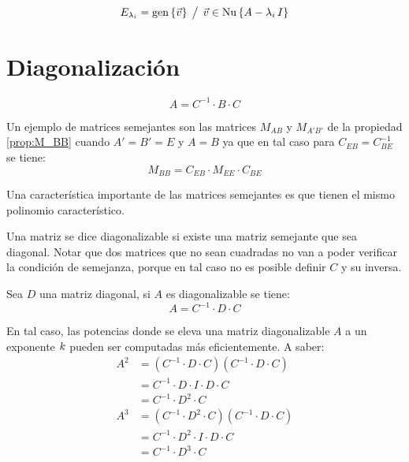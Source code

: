 \begin{mdframed}[style=DefinitionFrame]
    \begin{defn}
    \end{defn}
    \begin{equation*}
        E_{\lambda_i} = \operatorname{gen} { \left\{ {\Vec{v}} \right\} } \hspace{1ex} \big/ \hspace{1ex} \Vec{v} \in \operatorname{Nu} { \left\{ {A - \lambda_i \, I} \right\} }
    \end{equation*}
\end{mdframed}


\section{Diagonalización}

\begin{mdframed}[style=DefinitionFrame]
    \begin{defn}
    \end{defn}
    \begin{equation*}
        A = C^{-1} \cdot B \cdot C
    \end{equation*}
\end{mdframed}

Un ejemplo de matrices semejantes son las matrices $M_{AB}$ y $M_{A'B'}$ de la propiedad \ref{prop:M_BB} cuando $A'=B'=E$ y $A=B$ ya que en tal caso para $C_{EB}=C_{BE}^{-1}$ se tiene:
\begin{equation*}
    M_{BB} = C_{EB} \cdot M_{EE} \cdot C_{BE}
\end{equation*}

Una característica importante de las matrices semejantes es que tienen el mismo polinomio característico.

Una matriz se dice diagonalizable si existe una matriz semejante que sea diagonal.
Notar que dos matrices que no sean cuadradas no van a poder verificar la condición de semejanza, porque en tal caso no es posible definir $C$ y su inversa.

Sea $D$ una matriz diagonal, si $A$ es diagonalizable se tiene:
\begin{equation*}
    A = C^{-1} \cdot D \cdot C
\end{equation*}

En tal caso, las potencias donde se eleva una matriz diagonalizable $A$ a un exponente $k$ pueden ser computadas más eficientemente.
A saber:
\begin{align*}
    A^2 &= \left( C^{-1} \cdot D \cdot C \right) \left( C^{-1} \cdot D \cdot C \right)
    \\
    &= C^{-1} \cdot D \cdot I \cdot D \cdot C
    \\
    &= C^{-1} \cdot D^2 \cdot C
    \\[1ex]
    A^3 &= \left( C^{-1} \cdot D^2 \cdot C \right) \left( C^{-1} \cdot D \cdot C \right)
    \\
    &= C^{-1} \cdot D^2 \cdot I \cdot D \cdot C
    \\
    &= C^{-1} \cdot D^3 \cdot C
\end{align*}

